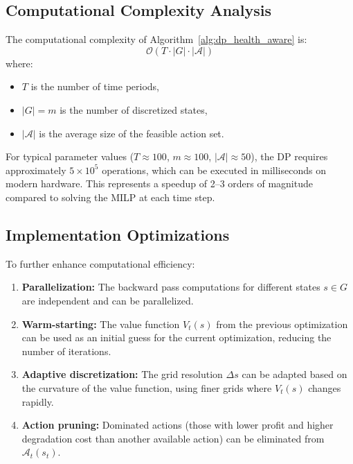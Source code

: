 \documentclass[10pt,twocolumn]{article}
\begin{document}
\subsection{Computational Complexity Analysis}

The computational complexity of Algorithm~\ref{alg:dp_health_aware} is:
\[
\mathcal{O}\left(T \cdot |G| \cdot |\mathcal{A}| \right)
\]
where:
\begin{itemize}
    \item $T$ is the number of time periods,
    \item $|G| = m$ is the number of discretized states,
    \item $|\mathcal{A}|$ is the average size of the feasible action set.
\end{itemize}

For typical parameter values ($T \approx 100$, $m \approx 100$, $|\mathcal{A}| \approx 50$), the DP requires approximately $5 \times 10^5$ operations, which can be executed in milliseconds on modern hardware. This represents a speedup of 2--3 orders of magnitude compared to solving the MILP at each time step.

\subsection{Implementation Optimizations}

To further enhance computational efficiency:

\begin{enumerate}
    \item \textbf{Parallelization:} The backward pass computations for different states $s \in G$ are independent and can be parallelized.
    
    \item \textbf{Warm-starting:} The value function $V_t(s)$ from the previous optimization can be used as an initial guess for the current optimization, reducing the number of iterations.
    
    \item \textbf{Adaptive discretization:} The grid resolution $\Delta s$ can be adapted based on the curvature of the value function, using finer grids where $V_t(s)$ changes rapidly.
    
    \item \textbf{Action pruning:} Dominated actions (those with lower profit and higher degradation cost than another available action) can be eliminated from $\mathcal{A}_t(s_t)$.
\end{enumerate}
\end{document}
